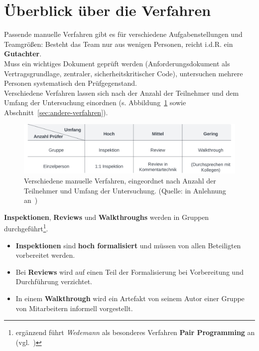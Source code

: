 \section{Überblick über die Verfahren}

Passende manuelle Verfahren gibt es für verschiedene Aufgabenstellungen und Teamgrößen: Besteht das Team nur aus wenigen Personen, reicht i.d.R. ein \textbf{Gutachter}.\\
Muss ein wichtiges Dokument geprüft werden (Anforderungsdokument als Vertragsgrundlage, zentraler, sicherheitskritischer Code), untersuchen mehrere Personen systematisch den Prüfgegenstand.\\

\noindent
Verschiedene Verfahren lassen sich nach der Anzahl der Teilnehmer und dem Umfang der Untersuchung einordnen (s. Abbildung~\ref{fig:manuelleverfahren} sowie Abschnitt~\ref{sec:andere-verfahren}).

\begin{figure}
    \centering
    \includegraphics[scale=0.4]{part four/Manuelle Verfahren/img/manuelleverfahren}
    \caption{Verschiedene manuelle Verfahren, eingeordnet nach Anzahl der Teilnehmer und Umfang der Untersuchung. (Quelle: in Anlehnung an~\cite[Tab. 3.1, 17]{Wed09c})}
    \label{fig:manuelleverfahren}
\end{figure}

\noindent
\textbf{Inspektionen}, \textbf{Reviews} und \textbf{Walkthroughs} werden in Gruppen durchgeführt\footnote{
ergänzend führt \textit{Wedemann} als besonderes Verfahren \textbf{Pair Programming} an (vgl.~\cite[18]{Wed09c})
}.\\

\begin{itemize}
    \item \textbf{Inspektionen} sind \textbf{hoch formalisiert} und müssen von allen Beteiligten vorbereitet werden.
    \item Bei \textbf{Reviews} wird auf einen Teil der Formalisierung bei Vorbereitung und Durchführung verzichtet.\\
    \item In einem \textbf{Walkthrough} wird ein Artefakt von seinem Autor einer Gruppe von Mitarbeitern informell vorgestellt.
\end{itemize}
